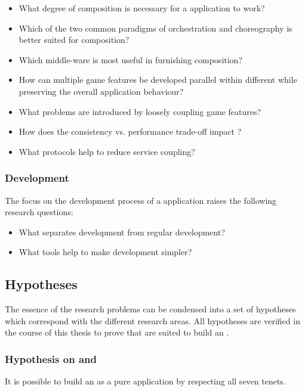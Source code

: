 \begin{itemize}
  \item What degree of composition is necessary for a \ms{} application
  to work?
  \item Which of the two common paradigms of orchestration and choreography is
  better suited for \ms{} composition?
  \item Which middle-ware is most useful in furnishing \ms{} composition?
  \item How can multiple game features be developed parallel within different
  \mss{} while preserving the overall application behaviour?
  \item What problems are introduced by loosely coupling game features?
  \item How does the consistency vs. performance trade-off impact \ogs{}?
  \item What protocols help to reduce service coupling?
\end{itemize}

\subsubsection{\ms{} Development}
The focus on the development process of a \ms{} application raises the
following research questions:

\begin{itemize}
  \item What separates \ms{} development from regular development?
  \item What tools help to make \ms{} development simpler?
\end{itemize}

\subsection{Hypotheses}
\label{sub:hypothesis}

The essence of the research problems can be condensed into a set of hypotheses
which correspond with the different research areas. All hypotheses are
verified in the course of this thesis to prove that \mss{} are suited to
build an \og{}. 

\subsubsection{Hypothesis on \ogs{} and \mss{}}
It is possible to build an \og{} as a pure \ms{} application by
respecting all seven \ms{} tenets.

